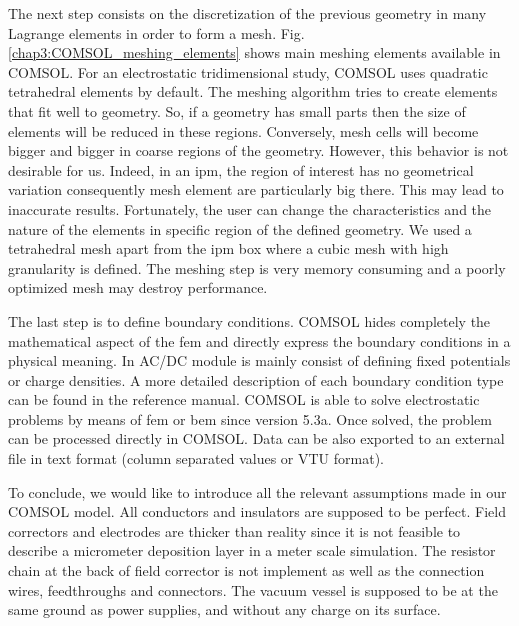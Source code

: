 \begin{refsection}
	

	The next step consists on the discretization of the previous geometry in many Lagrange elements in order to form a mesh. Fig. \ref{chap3:COMSOL_meshing_elements} shows main meshing elements available in COMSOL. For an electrostatic tridimensional study, COMSOL uses quadratic tetrahedral elements by default. The meshing algorithm tries to create elements that fit well to geometry. So, if a geometry has small parts then the size of elements will be reduced in these regions. Conversely, mesh cells will become bigger and bigger in coarse regions of the geometry. However, this behavior is not desirable for us. Indeed, in an \acrshort{ipm}, the region of interest has no geometrical variation consequently mesh element are particularly big there. This may lead to inaccurate results. Fortunately, the user can change the characteristics and the nature of the elements in specific region of the defined geometry. We used a tetrahedral mesh apart from the \acrshort{ipm} box where a cubic mesh with high granularity is defined. The meshing step is very memory consuming and a poorly optimized mesh may destroy performance.

	

	The last step is to define boundary conditions. COMSOL hides completely the mathematical aspect of the \acrshort{fem} and directly express the boundary conditions in a physical meaning. In AC/DC module is mainly consist of defining fixed potentials or charge densities. A more detailed description of each boundary condition type can be found in the reference manual. COMSOL is able to solve electrostatic problems by means of \acrshort{fem} or \acrshort{bem} since version 5.3a.
	Once solved, the problem can be processed directly in COMSOL. Data can be also exported to an external file in text format (column separated values or VTU format).

	To conclude, we would like to introduce all the relevant assumptions made in our COMSOL model. All conductors and insulators are supposed to be perfect. Field correctors and electrodes are thicker than reality since it is not feasible to describe a micrometer deposition layer in a meter scale simulation. The resistor chain at the back of field corrector is not implement as well as the connection wires, feedthroughs and connectors. The vacuum vessel is supposed to be at the same ground as power supplies, and without any charge on its surface.


\end{refsection}

